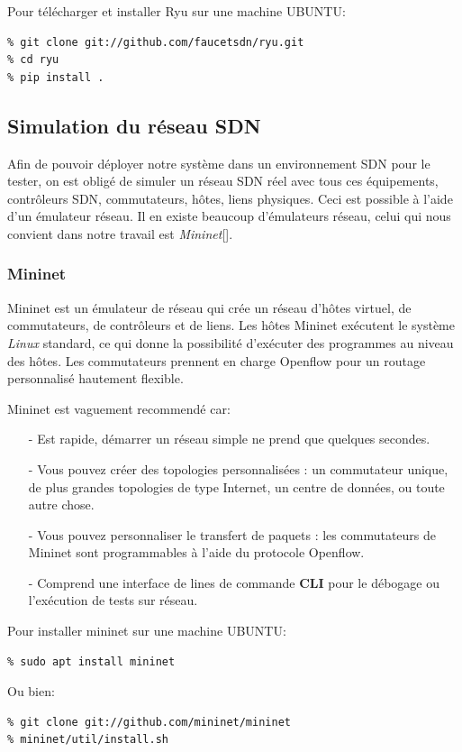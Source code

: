 \noindent Pour télécharger et installer Ryu sur une machine UBUNTU:
\begin{verbatim}
% git clone git://github.com/faucetsdn/ryu.git
% cd ryu
% pip install .
\end{verbatim}


\subsection{Simulation du réseau SDN}
Afin de pouvoir déployer notre système dans un environnement SDN pour le tester, on est obligé de simuler un réseau SDN réel avec tous ces équipements, contrôleurs SDN, commutateurs, hôtes, liens physiques. Ceci est possible à l'aide d'un émulateur réseau. Il en existe beaucoup d'émulateurs réseau, celui qui nous convient dans notre travail est \textit{Mininet}[\cite{28}].

\subsubsection{Mininet}
Mininet est un émulateur de réseau qui crée un réseau d’hôtes virtuel, de commutateurs, de contrôleurs et de liens. Les hôtes Mininet exécutent le système \textit{Linux} standard, ce qui donne la possibilité d'exécuter des programmes au niveau des hôtes. Les commutateurs prennent en charge Openflow pour un routage personnalisé hautement flexible.

\noindent Mininet est vaguement recommendé car:\\
\begin{itemize}
\item[-] Est rapide, démarrer un réseau simple ne prend que quelques secondes.\\
\item[-] Vous pouvez créer des topologies personnalisées : un commutateur unique, de plus grandes topologies de type Internet, un centre de données, ou toute autre chose.\\
\item[-] Vous pouvez personnaliser le transfert de paquets : les commutateurs de Mininet sont programmables à l’aide du protocole Openflow.\\
\item[-] Comprend une interface de lines de commande \textbf{CLI} pour le débogage ou l’exécution de tests sur réseau.\\
\end{itemize}

\noindent Pour installer mininet sur une machine UBUNTU:
\begin{verbatim}
% sudo apt install mininet
\end{verbatim}
Ou bien: 
\begin{verbatim}
% git clone git://github.com/mininet/mininet
% mininet/util/install.sh
\end{verbatim}


